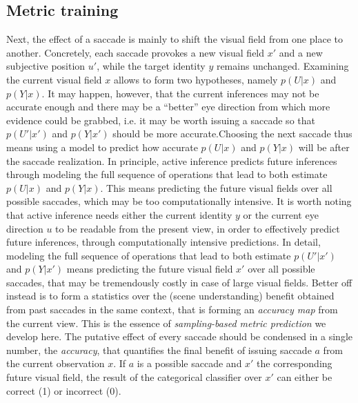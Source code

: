 \subsection{Metric training}
Next, the effect of a saccade is mainly to shift the visual field from one place to another. 
\ICANN Concretely, each saccade provokes a new visual field $x'$ and a new subjective position $u'$, while the target identity $y$ remains unchanged. Examining the current visual field $x$ allows to form two hypotheses, namely $p(U|x)$ and $p(Y|x)$. It may happen, however, that the current inferences may not be accurate enough and there may be a ``better'' eye direction from which more evidence could be grabbed, i.e. it may be worth issuing a saccade so that $p(U'|x')$ and $p(Y|x')$ should be more accurate.\fi Choosing the next saccade thus means using a model to predict how accurate $p(U|x)$ and $p(Y|x)$ will be after the saccade realization. 
\ICANN 
In principle, active inference predicts future inferences through modeling the full sequence of operations that lead to both estimate $p(U|x)$ and $p(Y|x)$. This means predicting the future visual fields over all possible saccades, which may be too computationally intensive.
\else It is worth noting that active inference needs either the current identity $y$ or the current eye direction $u$ to be readable from the present view, in order to effectively predict future inferences, through computationally intensive predictions. In detail, modeling the full sequence of operations that lead to both estimate $p(U'|x')$ and $p(Y|x')$ means predicting the future visual field $x'$ over all possible saccades, that may be tremendously costly in case of large visual fields. 
\fi
Better off instead is to form a statistics over the (scene understanding) benefit obtained from past saccades in the same context, that is forming an \emph{accuracy map} from the current view. This is the essence of \emph{sampling-based metric prediction} we develop here. The putative effect of every saccade should be condensed in a single number, the \emph{accuracy}, that quantifies the final benefit of issuing saccade $a$ %
from the current observation $x$. If $a$ is a possible saccade and $x'$ the corresponding future visual field, the result of the categorical classifier over $x'$ can either be correct (1) or incorrect (0).

